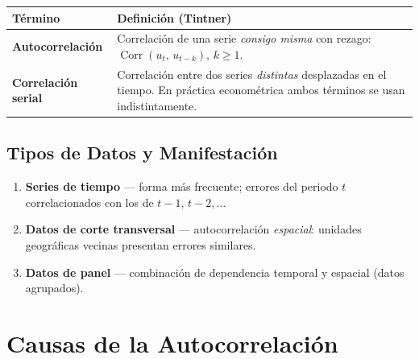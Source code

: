 \documentclass[11pt, letterpaper]{article}
\begin{document}
\begin{center}
\begin{tabular}{lp{9.5cm}}
\toprule
\textbf{T\'ermino} & \textbf{Definici\'on (Tintner)} \\
\midrule
\textbf{Autocorrelaci\'on} &
  Correlaci\'on de una serie \emph{consigo misma} con rezago:
  $\operatorname{Corr}(u_t,\, u_{t-k})$, $k \geq 1$. \\[5pt]
\textbf{Correlaci\'on serial} &
  Correlaci\'on entre dos series \emph{distintas} desplazadas en el tiempo.
  En pr\'actica econom\'etrica ambos t\'erminos se usan indistintamente. \\
\bottomrule
\end{tabular}
\end{center}

\subsection{Tipos de Datos y Manifestaci\'on}

\begin{enumerate}
  \item \textbf{Series de tiempo} --- forma m\'as frecuente; errores del
    periodo $t$ correlacionados con los de $t-1,\,t-2,\ldots$
  \item \textbf{Datos de corte transversal} --- autocorrelaci\'on
    \emph{espacial}: unidades geogr\'aficas vecinas presentan errores similares.
  \item \textbf{Datos de panel} --- combinaci\'on de dependencia temporal
    y espacial (datos agrupados).
\end{enumerate}

\section{Causas de la Autocorrelaci\'on}
\end{document}
